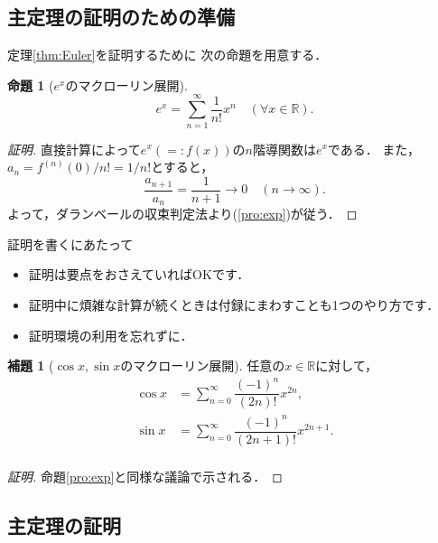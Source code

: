 \documentclass[12pt,a4j,final]{jreport}
\theoremstyle{definition}
\newtheorem{Pro}[Thm]{命題}
\newtheorem{Lem}[Thm]{補題}
\begin{document}
\subsection{主定理の証明のための準備}

\noindent
定理\ref{thm:Euler}を証明するために
次の命題を用意する．

\begin{Pro}[$e^{x}$のマクローリン展開]
\begin{equation}\label{pro:exp}
e^{x}=\sum_{n=1}^{\infty}\dfrac{1}{n!}x^{n}
\quad
(\forall x\in\mathbb{R}).
\end{equation}
\end{Pro}

\begin{proof}[証明]
直接計算によって$e^{x}(=:f(x))$の$n$階導関数は$e^{x}$である．
また，$a_{n}=f^{(n)}(0)/n!=1/n!$とすると，
\begin{equation*}
\dfrac{a_{n+1}}{a_{n}}=\dfrac{1}{n+1} \to 0
\quad(n \to \infty).
\end{equation*}
よって，ダランベールの収束判定法より(\ref{pro:exp})が従う．
\end{proof}

\begin{itembox}[l]{証明を書くにあたって} %
\begin{itemize}
\item 証明は要点をおさえていればOKです．
\item 証明中に煩雑な計算が続くときは付録にまわすことも1つのやり方です．
\item 証明環境の利用を忘れずに．
\end{itemize}
\end{itembox}


\begin{Lem}[$\cos x, \sin x$のマクローリン展開]
任意の$x\in \mathbb{R}$に対して，
\begin{align*}
\cos x &= \sum_{n=0}^{\infty}\dfrac{(-1)^{n}}{(2n)!}x^{2n},\\
\sin x &= \sum_{n=0}^{\infty}\dfrac{(-1)^{n}}{(2n+1)!}x^{2n+1}.\\
\end{align*}
\end{Lem}

\begin{proof}[証明]
命題\ref{pro:exp}と同様な議論で示される．
\end{proof}


\subsection{主定理の証明}
\end{document}
